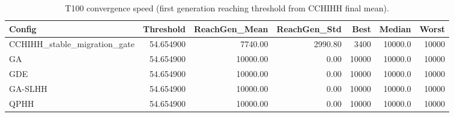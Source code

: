 \begin{table}[htbp]
\centering
\caption{T100 convergence speed (first generation reaching threshold from CCHIHH final mean).}
\label{tab:t100_convergence_speed}
\begin{tabular}{lrrrrrr}
\toprule
Config & Threshold & ReachGen_Mean & ReachGen_Std & Best & Median & Worst \\
\midrule
CCHIHH\_stable\_migration\_gate & 54.654900 & 7740.00 & 2990.80 & 3400 & 10000.0 & 10000 \\
GA & 54.654900 & 10000.00 & 0.00 & 10000 & 10000.0 & 10000 \\
GDE & 54.654900 & 10000.00 & 0.00 & 10000 & 10000.0 & 10000 \\
GA-SLHH & 54.654900 & 10000.00 & 0.00 & 10000 & 10000.0 & 10000 \\
QPHH & 54.654900 & 10000.00 & 0.00 & 10000 & 10000.0 & 10000 \\
\bottomrule
\end{tabular}
\end{table}
